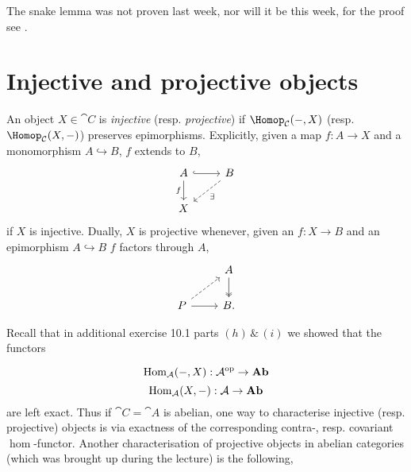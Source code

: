 \documentclass[../main.tex]{subfiles}
\begin{document}
The snake lemma was not proven last week, nor will it be this week, for the proof see \cite[Section~\RN{1}.1]{IversenCohomologyOfSheaves}.


\section{Injective and projective objects}

\begin{defn}
    An object $X\in \cat C$ is \emph{injective} (resp. \emph{projective}) if $\Hom[\cat C](-, X)$ (resp. $\Hom[\cat C](X,-)$) preserves epimorphisms. Explicitly, given a map $f\colon A\to X$ and a monomorphism $A\hookrightarrow B$, $f$ extends to $B$,
    \[\begin{tikzcd}
    	A & B \\
    	X
    	\arrow[hook, from=1-1, to=1-2]
    	\arrow["f"', from=1-1, to=2-1]
    	\arrow["\exists", dashed, from=1-2, to=2-1]
    \end{tikzcd}\] if $X$ is injective.
    Dually, $X$ is projective whenever, given an $f\colon X\to B$ and an epimorphism $A\hookrightarrow B$ $f$ factors through $A$,
    \[\begin{tikzcd}
    	& A \\
    	P & B.
    	\arrow[two heads, from=1-2, to=2-2]
    	\arrow[dashed, from=2-1, to=1-2]
    	\arrow[from=2-1, to=2-2]
    \end{tikzcd}\]
\end{defn}

Recall that in additional exercise 10.1 parts $(h)\, \& \,(i)$ we showed that the functors

\[\operatorname{Hom}_{\cat A}(-, X)\colon \cat A\opp \to \catAbelianGroup\]
\[\operatorname{Hom}_{\cat A}(X, -)\colon \cat A\to \catAbelianGroup\] are left exact. Thus if $\cat C = \cat A$ is abelian, one way to characterise injective (resp. projective) objects is via exactness of the corresponding contra-, resp. covariant $\hom$-functor. Another characterisation of projective objects in abelian categories (which was brought up during the lecture) is the following,
\end{document}
